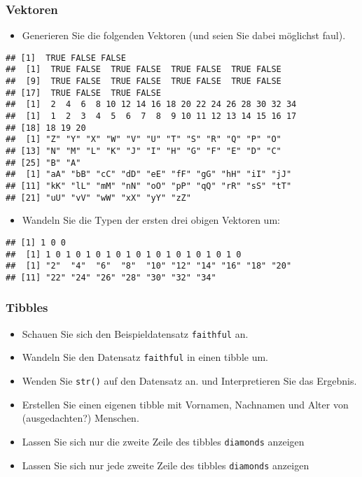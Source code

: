 \documentclass[
  ngerman,
]{article}
\providecommand{\tightlist}{%
  \setlength{\itemsep}{0pt}\setlength{\parskip}{0pt}}
\begin{document}
\hypertarget{vektoren-1}{%
\subsubsection{Vektoren}\label{vektoren-1}}

\begin{itemize}
\tightlist
\item
  Generieren Sie die folgenden Vektoren (und seien Sie dabei möglichst faul).
\end{itemize}

\begin{verbatim}
## [1]  TRUE FALSE FALSE
##  [1]  TRUE FALSE  TRUE FALSE  TRUE FALSE  TRUE FALSE
##  [9]  TRUE FALSE  TRUE FALSE  TRUE FALSE  TRUE FALSE
## [17]  TRUE FALSE  TRUE FALSE
##  [1]  2  4  6  8 10 12 14 16 18 20 22 24 26 28 30 32 34
##  [1]  1  2  3  4  5  6  7  8  9 10 11 12 13 14 15 16 17
## [18] 18 19 20
##  [1] "Z" "Y" "X" "W" "V" "U" "T" "S" "R" "Q" "P" "O"
## [13] "N" "M" "L" "K" "J" "I" "H" "G" "F" "E" "D" "C"
## [25] "B" "A"
##  [1] "aA" "bB" "cC" "dD" "eE" "fF" "gG" "hH" "iI" "jJ"
## [11] "kK" "lL" "mM" "nN" "oO" "pP" "qQ" "rR" "sS" "tT"
## [21] "uU" "vV" "wW" "xX" "yY" "zZ"
\end{verbatim}

\begin{itemize}
\tightlist
\item
  Wandeln Sie die Typen der ersten drei obigen Vektoren um:
\end{itemize}

\begin{verbatim}
## [1] 1 0 0
##  [1] 1 0 1 0 1 0 1 0 1 0 1 0 1 0 1 0 1 0 1 0
##  [1] "2"  "4"  "6"  "8"  "10" "12" "14" "16" "18" "20"
## [11] "22" "24" "26" "28" "30" "32" "34"
\end{verbatim}

\hypertarget{tibbles-1}{%
\subsubsection{Tibbles}\label{tibbles-1}}

\begin{itemize}
\tightlist
\item
  Schauen Sie sich den Beispieldatensatz \texttt{faithful} an.
\item
  Wandeln Sie den Datensatz \texttt{faithful} in einen tibble um.
\item
  Wenden Sie \texttt{str()} auf den Datensatz an. und Interpretieren Sie das Ergebnis.
\item
  Erstellen Sie einen eigenen tibble mit Vornamen, Nachnamen und Alter von (ausgedachten?) Menschen.
\item
  Lassen Sie sich nur die zweite Zeile des tibbles \texttt{diamonds} anzeigen
\item
  Lassen Sie sich nur jede zweite Zeile des tibbles \texttt{diamonds} anzeigen
\end{itemize}
\end{document}
